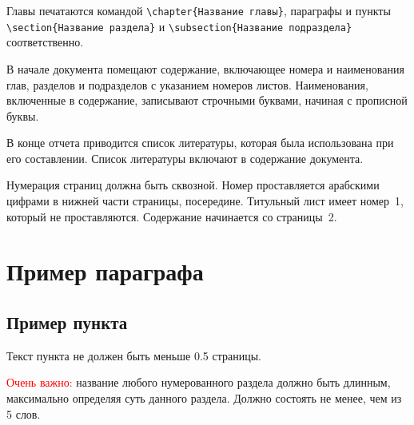 Главы печатаются командой \verb|\chapter{Название главы}|, параграфы и пункты
\verb|\section{Название раздела}| и \verb|\subsection{Название подраздела}|
соответственно.

В начале документа помещают содержание, включающее номера и наименования глав, 
разделов и подразделов с указанием номеров листов. Наименования, включенные в 
содержание, записывают строчными буквами, начиная с прописной буквы.

В конце отчета приводится список литературы, которая была использована 
при его составлении. Список литературы включают в содержание документа.

Нумерация страниц должна быть сквозной. Номер проставляется арабскими 
цифрами в нижней части страницы, посередине. Титульный лист имеет номер~1,
который не проставляются. Содержание начинается со страницы~2.

\section{Пример параграфа}

\subsection{Пример пункта}
Текст пункта не должен быть меньше 0.5 страницы.


\textcolor{red}{Очень важно:} название любого нумерованного раздела должно
быть длинным, максимально определяя суть данного раздела. Должно состоять
не менее, чем из 5 слов.
